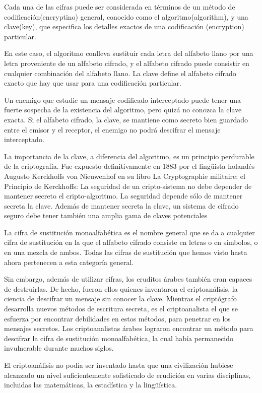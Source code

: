 	 
	 Cada una de las cifras puede ser considerada en términos de un método de codificación(encryptino) general, conocido como el algoritmo(algorithm), y una clave(key), que especifica los detalles exactos de una codificación (encryption) particular.
	 
	 En este caso, el algoritmo conlleva sustituir cada letra del alfabeto llano por una letra proveniente de un alfabeto cifrado, y el alfabeto cifrado puede consistir en cualquier combinación del alfabeto llano. La clave define el alfabeto cifrado exacto que hay que usar para una codificación particular.
	 
	 
	 Un enemigo que estudie un mensaje codificado interceptado puede tener una fuerte sospecha de la existencia del algoritmo, pero quizá no conozca la clave exacta. Si el alfabeto cifrado, la clave, se mantiene como secreto bien guardado entre el emisor y el receptor, el enemigo no podrá descifrar el mensaje interceptado.
	 
	 
	  La importancia de la clave, a diferencia del algoritmo, es un principio perdurable de la criptografía. Fue expuesto definitivamente en 1883 por el lingüista holandés Augusto Kerckhoffs von Nieuwenhof en su libro La Cryptographie militaire: el Principio de Kerckhoffs: La seguridad de un cripto-sistema no debe depender de mantener secreto el cripto-algoritmo. La seguridad depende sólo de mantener secreta la clave. Además de mantener secreta la clave, un sistema de cifrado seguro debe tener también una amplia gama de claves potenciales
	  
	  La cifra de sustitución monoalfabética es el nombre general que se da a cualquier cifra de sustitución en la que el alfabeto cifrado consiste en letras o en símbolos, o en una mezcla de ambos. Todas las cifras de sustitución que hemos visto hasta ahora pertenecen a esta categoría general.
	 
	 Sin embargo, además de utilizar cifras, los eruditos árabes también eran capaces de destruirlas. De hecho, fueron ellos quienes inventaron el criptoanálisis, la ciencia de descifrar un mensaje sin conocer la clave. Mientras el criptógrafo desarrolla nuevos métodos de escritura secreta, es el criptoanalista el que se esfuerza por encontrar debilidades en estos métodos, para penetrar en los mensajes secretos. Los criptoanalistas árabes lograron encontrar un método para descifrar la cifra de sustitución monoalfabética, la cual había permanecido invulnerable durante muchos siglos.
	 
	 El criptoanálisis no podía ser inventado hasta que una civilización hubiese alcanzado un nivel suficientemente sofisticado de erudición en varias disciplinas, incluidas las matemáticas, la estadística y la lingüística.
	 
